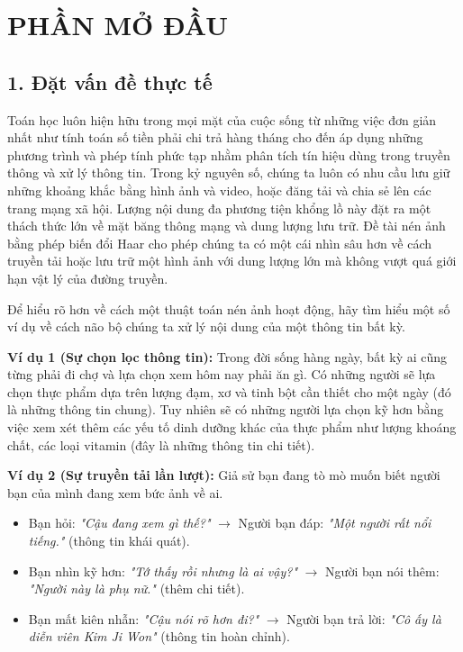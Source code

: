 \section*{PHẦN MỞ ĐẦU}

\subsection*{1. Đặt vấn đề thực tế}
Toán học luôn hiện hữu trong mọi mặt của cuộc sống từ những việc đơn giản nhất như tính toán số tiền phải chi trả hàng tháng cho đến áp dụng những
phương trình và phép tính phức tạp nhằm phân tích tín hiệu dùng trong truyền thông và xử lý thông tin. 
Trong kỷ nguyên số, chúng ta luôn có nhu cầu lưu giữ những khoảng khắc bằng hình ảnh và video, hoặc đăng tải và chia sẻ lên các trang mạng xã hội. 
Lượng nội dung đa phương tiện khổng lồ này đặt ra một thách thức lớn về mặt băng thông mạng và dung lượng lưu trữ. 
Đề tài nén ảnh bằng phép biến đổi Haar cho phép chúng ta có một cái nhìn sâu hơn về cách truyền tải hoặc lưu trữ một hình ảnh với dung lượng lớn mà
không vượt quá giới hạn vật lý của đường truyền.

Để hiểu rõ hơn về cách một thuật toán nén ảnh hoạt động, hãy tìm hiểu một số ví dụ về cách não bộ chúng ta xử lý nội dung
của một thông tin bất kỳ.

\textbf{Ví dụ 1 (Sự chọn lọc thông tin): }Trong đời sống hàng ngày, bất kỳ ai cũng từng phải đi chợ và lựa chọn xem hôm nay phải ăn gì.
Có những người sẽ lựa chọn thực phẩm dựa trên lượng đạm, xơ và tinh bột cần thiết cho một ngày (đó là những thông tin chung).
Tuy nhiên sẽ có những người lựa chọn kỹ hơn bằng việc xem xét thêm các yếu tố dinh dưỡng khác của thực phẩm như lượng khoáng chất, các loại vitamin (đây là những thông tin chi tiết).

\textbf{Ví dụ 2 (Sự truyền tải lần lượt):} Giả sử bạn đang tò mò muốn biết người bạn của mình đang xem bức ảnh về ai. 
\begin{itemize}
    \item Bạn hỏi: \textit{"Cậu đang xem gì thế?"} $\rightarrow$ Người bạn đáp: \textit{"Một người rất nổi tiếng."} (thông tin khái quát).
    \item Bạn nhìn kỹ hơn: \textit{"Tớ thấy rồi nhưng là ai vậy?"} $\rightarrow$ Người bạn nói thêm: \textit{"Người này là phụ nữ."} (thêm chi tiết).
    \item Bạn mất kiên nhẫn: \textit{"Cậu nói rõ hơn đi?"} $\rightarrow$ Người bạn trả lời: \textit{"Cô ấy là diễn viên Kim Ji Won"} (thông tin hoàn chỉnh).
\end{itemize}

